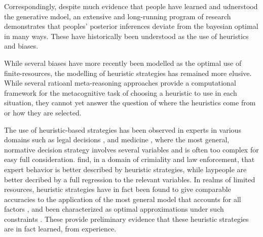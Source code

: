 Correspondingly, despite much evidence that people have learned and udnerstood the generative mdoel, an extensive and long-running program of research demonstrates that peoples' posterior inferences deviate from the bayesian optimal in many ways. These have historically been understood as the use of heuristics and biases.

While several biases have more recently been modelled as the optimal use of finite-resources, the modelling of heuristic strategies has remained more elusive. While several ratioanl meta-reasoning approaches provide a computational framework for the metacognitive task of choosing a heuristic to use in each situation, they cannot yet answer the question of where the heuristics come from or how they are selected.

The use of heuristic-based strategies has been observed in experts in various domains such as legal decisions \citep{dhami2001bailing}, and medicine \citep{reyna2006physician}, where the most general, normative decision strategy involves several variables and is often too complex for easy full consideration. \cite{garcia2009take} find, in a domain of crimiality and law enforcement, that expert behavior is better described by heuristic strategies, while laypeople are better decribed by a full regression to the relevant variables.  In realms of limited resources, heuristic strategies have in fact been found to give comparable accuracies to the application of the most general model that accounts for all factors \citep{gigerenzer2011heuristic}, and been characterized as optimal approximations under such constraints \citep{belousov2016catching, parpart2018heuristics}. These provide preliminary evidence that these heuristic strategies are in fact learned, from experience. 



